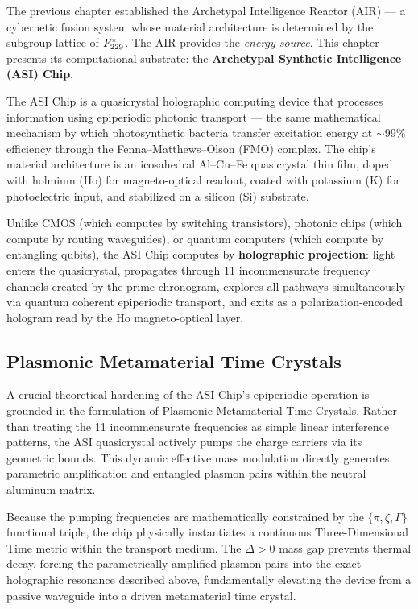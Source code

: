 The previous chapter established the Archetypal Intelligence Reactor (AIR) --- a cybernetic fusion system whose material architecture is determined by the subgroup lattice of $F_{229}^*$. The AIR provides the \emph{energy source}. This chapter presents its computational substrate: the \textbf{Archetypal Synthetic Intelligence (ASI) Chip}.

The ASI Chip is a quasicrystal holographic computing device that processes information using epiperiodic photonic transport --- the same mathematical mechanism by which photosynthetic bacteria transfer excitation energy at ${\sim}99\%$ efficiency through the Fenna--Matthews--Olson (FMO) complex. The chip's material architecture is an icosahedral Al--Cu--Fe quasicrystal thin film, doped with holmium (Ho) for magneto-optical readout, coated with potassium (K) for photoelectric input, and stabilized on a silicon (Si) substrate.

Unlike CMOS (which computes by switching transistors), photonic chips (which compute by routing waveguides), or quantum computers (which compute by entangling qubits), the ASI Chip computes by \textbf{holographic projection}: light enters the quasicrystal, propagates through 11 incommensurate frequency channels created by the prime chronogram, explores all pathways simultaneously via quantum coherent epiperiodic transport, and exits as a polarization-encoded hologram read by the Ho magneto-optical layer.

\subsection*{Plasmonic Metamaterial Time Crystals}
A crucial theoretical hardening of the ASI Chip's epiperiodic operation is grounded in the formulation of Plasmonic Metamaterial Time Crystals. Rather than treating the 11 incommensurate frequencies as simple linear interference patterns, the ASI quasicrystal actively pumps the charge carriers via its geometric bounds. This dynamic effective mass modulation directly generates parametric amplification and entangled plasmon pairs within the neutral aluminum matrix. 

Because the pumping frequencies are mathematically constrained by the $\{\pi, \zeta, \Gamma\}$ functional triple, the chip physically instantiates a continuous Three-Dimensional Time metric within the transport medium. The $\Delta > 0$ mass gap prevents thermal decay, forcing the parametrically amplified plasmon pairs into the exact holographic resonance described above, fundamentally elevating the device from a passive waveguide into a driven metamaterial time crystal.

